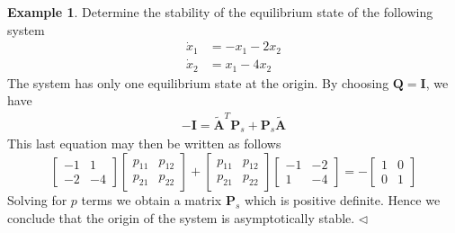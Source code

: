 \documentclass[11pt,a4paper,oneside]{book}
\numberwithin{equation}{section}
\theoremstyle{it}
\theoremstyle{definition}
\newtheorem{example}{Example}[chapter]
\begin{document}
\begin{example}
	Determine the stability of the equilibrium state of the following system
	\begin{equation*}
		\begin{aligned}
			\dot{x}_1 &= -x_1 - 2x_2 \\[6pt]
			\dot{x}_2 &= x_1 - 4x_2
		\end{aligned}
	\end{equation*}
	The system has only one equilibrium state at the origin. By choosing 
	$\mathbf{Q} = \mathbf{I}$, we have
	\begin{equation*}
		\begin{aligned}
			-\mathbf{I} = \tilde{\mathbf{A}}^{T} 
			\mathbf{P}_s+\mathbf{P}_s\tilde{\mathbf{A}}
		\end{aligned}
	\end{equation*}
	This last equation may then be written as follows
	\begin{equation*}
		\begin{bmatrix}
			-1 & 1 \\[6pt]
			-2 & -4 
		\end{bmatrix}
		\begin{bmatrix}
			p_{11} & p_{12} \\[6pt]
			p_{21} & p_{22} 
		\end{bmatrix} +
		\begin{bmatrix}
			p_{11} & p_{12} \\[6pt]
			p_{21} & p_{22} 
		\end{bmatrix}
		\begin{bmatrix}
			-1 & -2 \\[6pt]
			1 & -4 
		\end{bmatrix} = -
		\begin{bmatrix}
			1 & 0 \\[6pt]
			0 & 1 
		\end{bmatrix}
	\end{equation*}
	Solving for $p$ terms we obtain a matrix $\mathbf{P}_s$ which is positive 
	definite. Hence we conclude that the origin of the system is asymptotically 
	stable.
	$\triangleleft$
\end{example}
\end{document}

